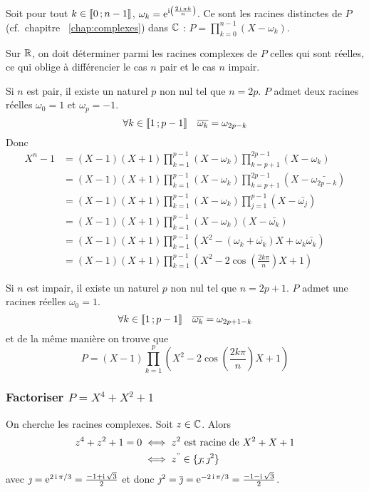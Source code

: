 Soit pour tout \(k \in \mathopen{\llbracket}0\mathclose{}\mathpunct{};n-1\mathclose{\rrbracket}\), \(\omega_k = 
\operatorname{e}^{\operatorname{i}\left(\frac{2\operatorname{i} \pi k}{n}\right)}\). Ce sont les racines distinctes de 
\(P\) (cf.\ chapitre~
\ref{chap:complexes}) dans \(\mathbb{C}\) : \(P = \prod_{k=0}^{n-1}(X-\omega_k)\).

Sur \(\mathbb{R}\), on doit déterminer parmi les racines complexes de \(P\) celles qui 
sont réelles, ce qui oblige à différencier le cas \(n\) pair et le cas \(n\) 
impair.

Si \(n\) est pair, il existe un naturel \(p\) non nul tel que \(n=2p\). \(P\) 
admet deux racines réelles \(\omega_0=1\) et \(\omega_p=-1\).
\begin{equation}
  \forall k \in \mathopen{\llbracket}1\mathclose{}\mathpunct{};p-1\mathclose{\rrbracket} \quad \overline{\omega_k}=\omega_{2p-k}
\end{equation}
Donc
\begin{align}
  X^n-1 &= (X-1)(X+1) \prod_{k=1}^{p-1} (X-\omega_k)\prod_{k=p+1}^{2p-1} 
  (X-\omega_k) \\
  &=(X-1)(X+1) \prod_{k=1}^{p-1} (X-\omega_k) \prod_{k=p+1}^{2p-1} 
  (X-\bar{\omega_{2p-k}})\\
  &=(X-1)(X+1) \prod_{k=1}^{p-1} (X-\omega_k) \prod_{j=1}^{p-1} 
  (X-\bar{\omega_{j}})\\
  &=(X-1)(X+1) \prod_{k=1}^{p-1} (X-\omega_k)(X-\bar{\omega_{k}})\\
  &=(X-1)(X+1) \prod_{k=1}^{p-1} 
  (X^2-(\omega_k+\bar{\omega_k})X+\omega_k\bar{\omega_k})\\
  &=(X-1)(X+1) \prod_{k=1}^{p-1} 
  \left(X^2-2\cos\left(\frac{2k\pi}{n}\right)X+1\right)
\end{align}

Si \(n\) est impair, il existe un naturel \(p\) non nul tel que \(n=2p+1\). 
\(P\) admet une racines réelles \(\omega_0=1\).
\begin{equation}
  \forall k \in \mathopen{\llbracket}1\mathclose{}\mathpunct{};p-1\mathclose{\rrbracket} \quad \overline{\omega_k}=\omega_{2p+1-k}
\end{equation}
et de la même manière on trouve que
\begin{equation}
  P=(X-1) \prod_{k=1}^{p} \left(X^2-2\cos\left(\frac{2k\pi}{n}\right)X+1\right)
\end{equation}

\subsubsection{Factoriser \(P=X^4+X^2+1\)}

On cherche les racines complexes. Soit \(z \in \mathbb{C}\). Alors
\begin{align}
  z^4+z^2+1=0 &\iff z^2 \text{~est racine de~} X^2+X+1 \\
  &\iff z^" \in \{\jmath ; \jmath^2\}
\end{align}
avec \(\jmath=\operatorname{e}^{2\operatorname{i}\pi/3} = \frac{-1+\operatorname{i}\sqrt{3}}{2}\) et donc 
\(\jmath^2=\overline{\jmath} = \operatorname{e}^{-2\operatorname{i}\pi/3} = \frac{-1-\operatorname{i}\sqrt{3}}{2}\). 

